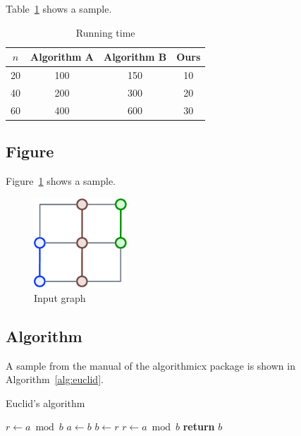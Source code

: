 Table~\ref{table:running_time} shows a sample.

\begin{table}[tbp]
\begin{center}
\begin{tabular}{c|ccc}
$n$  & Algorithm A  & Algorithm B & Ours  \\ \hline
20   & 100          & 150         & 10    \\
40   & 200          & 300         & 20    \\
60   & 400          & 600         & 30    \\
\end{tabular}
\caption{Running time}
\label{table:running_time}
\end{center}
\end{table}

\subsection{Figure}

Figure~\ref{fig:graph} shows a sample.

\begin{figure}[tbp]
\begin{center} 
\includegraphics[width=3.5cm]{sample_graph.pdf}
\caption{Input graph}
\label{fig:graph}
\end{center} 
\end{figure}

\subsection{Algorithm}

A sample from the manual of the algorithmicx package is shown in Algorithm~\ref{alg:euclid}.

\begin{algorithm}
\caption{Euclid's algorithm}\label{alg:euclid}
\begin{algorithmic}[1]
   \State $r\gets a\bmod b$
      \State $a\gets b$
      \State $b\gets r$
      \State $r\gets a\bmod b$
   \EndWhile\label{euclidendwhile}
   \State \textbf{return} $b$
\EndProcedure
\end{algorithmic}
\end{algorithm}




